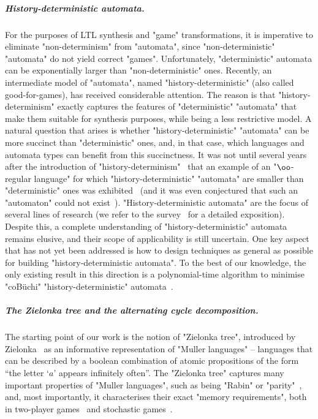 \documentclass{theoretics}
\begin{document}
\subparagraph{History-deterministic automata.} For the purposes of LTL synthesis and "game" transformations, it is imperative to eliminate "non-determinism" from "automata", since "non-deterministic" "automata" do not yield correct "games". Unfortunately, "deterministic" automata can be exponentially larger than "non-deterministic" ones.  
Recently, an intermediate model of "automata", named "history-deterministic" (also called good-for-games), has received considerable attention. The reason is that "history-determinism" exactly captures the features of "deterministic" "automata" that make them suitable for synthesis purposes, while being a less restrictive model.
A natural question that arises is whether "history-deterministic" "automata" can be more succinct than "deterministic" ones, and, in that case, which languages and automata types can benefit from this succinctness. It was not until several years after the introduction of "history-determinism"~\cite{HP06, Colcombet2009CostFunctions} that an example of an "$\oo$-regular language" for which "history-deterministic" "automata" are smaller than "deterministic" ones was exhibited~\cite{KS15DeterminisationGFG} (and it was even conjectured that such an "automaton" could not exist~\cite{Colcombet2012FormsND}).
"History-deterministic automata" are the focus of several lines of research (we refer to the survey~\cite{BL23SurveyHD} for a detailed exposition). Despite this, a complete understanding of "history-deterministic" automata remains elusive, and their scope of applicability is still uncertain. One key aspect that has not yet been addressed is how to design techniques as general as possible for building "history-deterministic automata". To the best of our knowledge, the only existing result in this direction is a polynomial-time algorithm to minimise "coBüchi" "history-deterministic" automata~\cite{AK22MinimizingGFG}.


\subparagraph{The Zielonka tree and the alternating cycle decomposition.} The starting point of our work is the notion of "Zielonka tree", introduced by Zielonka~\cite{Zielonka1998infinite} as an informative representation of "Muller languages" -- languages that can be described by a boolean
combination of atomic propositions of the form ``the letter `$a$' appears infinitely often''. The "Zielonka tree" captures many important properties of "Muller languages", such as being "Rabin" or "parity"~\cite{Zielonka1998infinite}, and, most importantly, it characterises their exact "memory requirements", both in two-player games~\cite{DJW1997memory} and stochastic games~\cite{Horn09RandomFruits}. 
\end{document}
